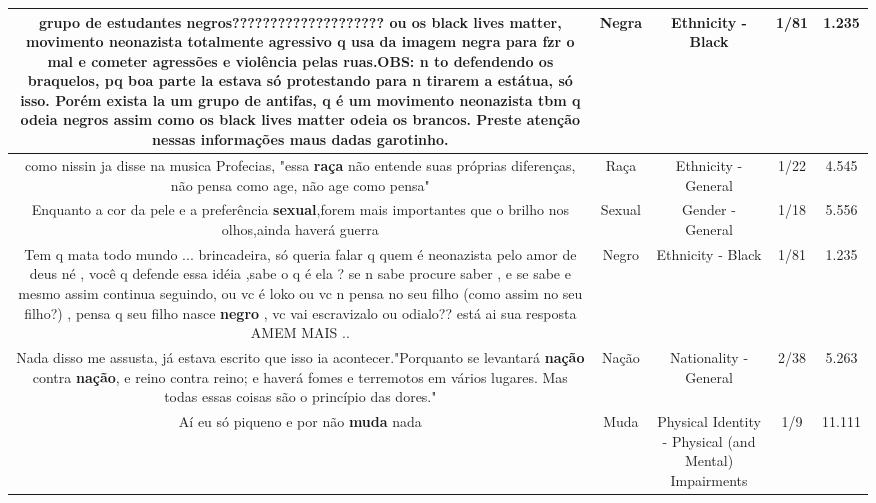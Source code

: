 \documentclass[11pt]{article}
\newlength\mylength
\begin{document}
\begin{center}
\begin{longtable}{|C{.65\mylength}|C{.30\mylength}|C{.12\mylength}|C{.12\mylength}|C{.12\mylength}|}
  \small grupo de estudantes negros???????????????????? ou os black lives matter, movimento neonazista  totalmente agressivo q usa da imagem \textbf{negra} para fzr o mal e cometer agressões e violência pelas ruas.OBS: n to defendendo  os braquelos, pq boa parte la estava só protestando para n tirarem a estátua, só isso. Porém exista la um grupo de antifas, q é um movimento neonazista tbm q odeia negros assim como os black lives matter odeia os brancos. Preste atenção nessas informações maus dadas garotinho.\normalsize   & Negra & Ethnicity - Black & 1/81 & 1.235 \\  \hline
  \small como nissin ja disse na musica Profecias, "essa \textbf{raça} não entende suas próprias diferenças, não pensa como age, não age como pensa"\normalsize   & Raça & Ethnicity - General & 1/22 & 4.545 \\  \hline
  \small Enquanto a cor da pele e a preferência \textbf{sexual},forem mais importantes que o brilho nos olhos,ainda haverá guerra\normalsize   & Sexual & Gender - General & 1/18 & 5.556 \\  \hline
  \small Tem q mata todo mundo ...   brincadeira, só queria falar q quem é neonazista pelo amor de deus né , você q defende essa idéia ,sabe o q é ela ? se n sabe procure saber , e se sabe e mesmo assim continua seguindo, ou vc é loko ou vc n pensa no seu filho (como assim no seu filho?) , pensa q seu filho nasce \textbf{negro} , vc vai escravizalo ou odialo?? está ai sua resposta AMEM MAIS ..\normalsize   & Negro & Ethnicity - Black & 1/81 & 1.235 \\  \hline
  \small Nada disso me assusta, já estava escrito que isso ia acontecer."Porquanto se levantará \textbf{nação} contra \textbf{nação}, e reino contra reino; e haverá fomes e terremotos em vários lugares. Mas todas essas coisas são o princípio das dores."\normalsize   & Nação & Nationality - General & 2/38 & 5.263 \\  \hline
  \small Aí eu só piqueno e por não \textbf{muda} nada\normalsize   & Muda & Physical Identity - Physical (and Mental) Impairments & 1/9 & 11.111 \\  \hline

\end{longtable}
\end{center}
\end{document}
